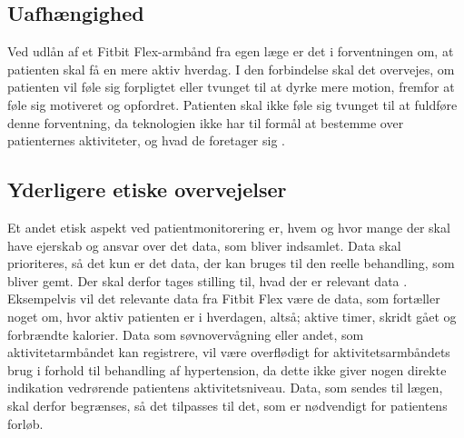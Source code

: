 \subsection{Uafhængighed}

Ved udlån af et Fitbit Flex-armbånd fra egen læge er det i forventningen om, at patienten skal få en mere aktiv hverdag. I den forbindelse skal det overvejes, om patienten vil føle sig forpligtet eller tvunget til at dyrke mere motion, fremfor at føle sig motiveret og opfordret. Patienten skal ikke føle sig tvunget til at fuldføre denne forventning, da teknologien ikke har til formål at bestemme over patienternes aktiviteter, og hvad de foretager sig \citep{Nordgren2013}.

\subsection{Yderligere etiske overvejelser}
Et andet etisk aspekt ved patientmonitorering er, hvem og hvor mange der skal have ejerskab og ansvar over det data, som bliver indsamlet. Data skal prioriteres, så det kun er det data, der kan bruges til den reelle behandling, som bliver gemt. Der skal derfor tages stilling til, hvad der er relevant data \citep{patienthome2015}. Eksempelvis vil det relevante data fra Fitbit Flex være de data, som fortæller noget om, hvor aktiv patienten er i hverdagen, altså; aktive timer, skridt gået og forbrændte kalorier. Data som søvnovervågning eller andet, som aktivitetarmbåndet kan registrere, vil være overflødigt for aktivitetsarmbåndets brug i forhold til behandling af hypertension, da dette ikke giver nogen direkte indikation vedrørende patientens aktivitetsniveau. Data, som sendes til lægen, skal derfor begrænses, så det tilpasses til det, som er nødvendigt for patientens forløb. 